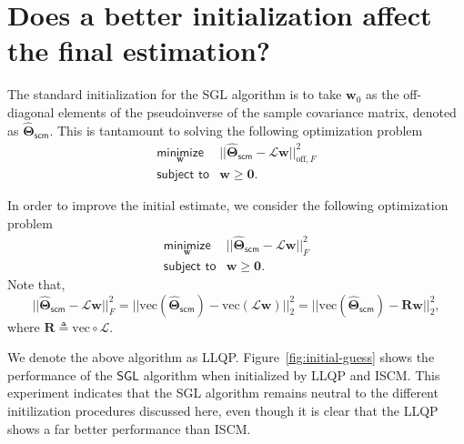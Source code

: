 \section{Does a better initialization affect the final estimation?}
The standard initialization for the \textsf{SGL} algorithm is to take $\mathbf{w}_0$ as the off-diagonal elements of the
pseudoinverse of the sample covariance matrix, denoted as $\hat{\boldsymbol{\Theta}}_{\textsf{scm}}$.
This is tantamount to solving the following optimization problem
$$\begin{array}{ll}
  \underset{\mathbf{w}}{\textsf{minimize}} & ||\hat{\boldsymbol{\Theta}}_{\textsf{scm}} - \mathcal{L}\mathbf{w}||^{2}_{\text{off}, F}\\
  \textsf{subject to} & \mathbf{w} \geq \mathbf{0}.
\end{array}$$

In order to improve the initial estimate, we consider the following optimization problem
\begin{equation}
\begin{array}{ll}
  \underset{\mathbf{w}}{\textsf{minimize}} & ||\hat{\boldsymbol{\Theta}}_{\textsf{scm}} - \mathcal{L}\mathbf{w}||^{2}_{F}\\
  \textsf{subject to} & \mathbf{w} \geq \mathbf{0}.
\end{array}
\end{equation}
Note that,
\begin{equation}
||\hat{\boldsymbol{\Theta}}_{\textsf{scm}} - \mathcal{L}\mathbf{w}||^{2}_{F} =
||\text{vec}\left(\hat{\boldsymbol{\Theta}}_{\textsf{scm}}\right) - \text{vec}(\mathcal{L}\mathbf{w})||^{2}_{2} =
||\text{vec}\left(\hat{\boldsymbol{\Theta}}_{\textsf{scm}}\right) - \mathbf{R}\mathbf{w}||^{2}_{2},
\end{equation}
where $\mathbf{R}\triangleq \text{vec}\circ \mathcal{L}$.

We denote the above algorithm as \textsf{LLQP}. Figure~\ref{fig:initial-guess} shows the performance of the
$\textsf{SGL}$ algorithm when initialized by \textsf{LLQP} and \textsf{ISCM}. This experiment indicates that
the \textsf{SGL} algorithm remains neutral to the different initilization procedures discussed here, even though
it is clear that the \textsf{LLQP} shows a far better performance than \textsf{ISCM}.

